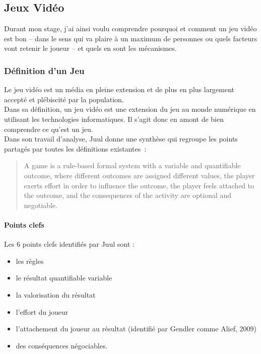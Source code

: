 \subsection{Jeux Vidéo}
Durant mon stage, j'ai ainsi voulu comprendre pourquoi et comment un jeu vidéo est bon – dans le sens qui va plaire à un maximum de personnes ou quels facteurs vont retenir le joueur – et quels en sont les mécanismes. 

	\subsubsection{Définition d'un Jeu}
Le jeu vidéo est un média en pleine extension et de plus en plus largement accepté et plébiscité par la population.
\\Dans sa définition, un jeu vidéo est une extension du jeu au monde numérique en utilisant les technologies informatiques. Il s'agit donc en amont de bien comprendre ce qu'est un jeu. \\Dans son travail d’analyse, Juul\cite{Juul05} donne une synthèse qui regroupe les points partagés par toutes les définitions existantes~:
\begin{quotation}
A game is a rule-based formal system with a variable and quantifiable outcome, where different outcomes are assigned different values, the player exerts effort in order to influence the outcome, the player feels attached to the outcome, and the consequences of the activity are optional and negotiable. 
\end{quotation}
\paragraph{Points clefs \\}
Les 6 points clefs identifiés par Juul sont :
\begin{itemize}
	\item les règles
	\item le résultat quantifiable variable
	\item la valorisation du résultat
	\item l’effort du joueur
	\item l’attachement du joueur au résultat (identifié par Gendler comme Alief, 2009)
	\item des conséquences négociables.
\end{itemize}


